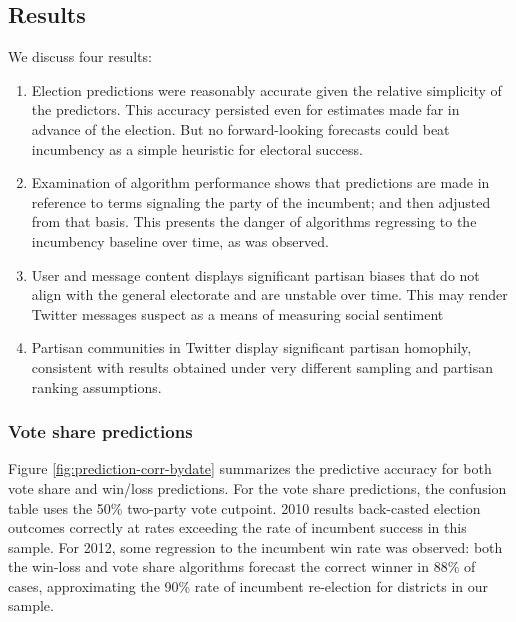 \documentclass{article}
\begin{document}
\subsection{Results}
\label{sec:results}

We discuss four results:
\begin{enumerate}
\item Election predictions were reasonably accurate given the relative
  simplicity of the predictors. This accuracy persisted even for
  estimates made far in advance of the election. But no
  forward-looking forecasts could beat incumbency as a simple
  heuristic for electoral success.
\item Examination of algorithm performance shows that predictions are
  made in reference to terms signaling the party of the incumbent; and
  then adjusted from that basis. This presents the danger of
  algorithms regressing to the incumbency baseline over time, as was observed.
\item User and message content displays significant partisan biases
  that do not align with the general electorate and are unstable over time.
  This may render Twitter messages suspect as a means of measuring
  social sentiment
\item Partisan communities in Twitter display significant partisan
  homophily, consistent with results obtained under very different
  sampling and partisan ranking assumptions. 
\end{enumerate}

\subsubsection{Vote share predictions}
\label{sec:predictions}

Figure \ref{fig:prediction-corr-bydate} summarizes the predictive
accuracy for both vote share and win/loss predictions. For the vote
share predictions, the confusion table uses the 50\% two-party vote
cutpoint. 2010 results back-casted election outcomes correctly at
rates exceeding the rate of incumbent success in this sample. For
2012, some regression to the incumbent win rate was observed: both the
win-loss and vote share algorithms forecast the correct winner in 88\%
of cases, approximating the 90\% rate of incumbent re-election for
districts in our sample.
\end{document}
